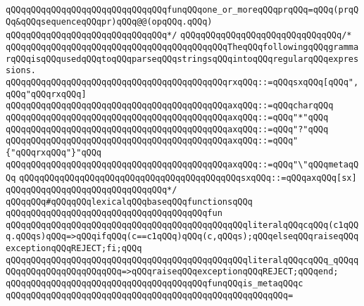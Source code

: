 \verb|qQQqqQQqqQQqqQQqqQQqqQQqqQQqqQQqfunqQQqone_or_moreqQQqprqQQq=qQQq(prqQQq&qQQqsequenceqQQqpr)qQQq@@(opqQQq.qQQq)|\newline
\verb|qQQqqQQqqQQqqQQqqQQqqQQqqQQqqQQq*/|\newline
\newline
\verb|qQQqqQQqqQQqqQQqqQQqqQQqqQQqqQQq/*|\newline
\verb|qQQqqQQqqQQqqQQqqQQqqQQqqQQqqQQqqQQqqQQqqQQqTheqQQqfollowingqQQqgrammarqQQqisqQQqusedqQQqtoqQQqparseqQQqstringsqQQqintoqQQqregularqQQqexpressions.|\newline
\newline
\verb|qQQqqQQqqQQqqQQqqQQqqQQqqQQqqQQqqQQqqQQqqQQqrxqQQq::=qQQqsxqQQq[qQQq",qQQq"qQQqrxqQQq]|\newline
\newline
\verb|qQQqqQQqqQQqqQQqqQQqqQQqqQQqqQQqqQQqqQQqqQQqaxqQQq::=qQQqcharqQQq|\newline
\verb|qQQqqQQqqQQqqQQqqQQqqQQqqQQqqQQqqQQqqQQqqQQqaxqQQq::=qQQq"*"qQQq|\newline
\verb|qQQqqQQqqQQqqQQqqQQqqQQqqQQqqQQqqQQqqQQqqQQqaxqQQq::=qQQq"?"qQQq|\newline
\verb|qQQqqQQqqQQqqQQqqQQqqQQqqQQqqQQqqQQqqQQqqQQqaxqQQq::=qQQq"{"qQQqrxqQQq"}"qQQq|\newline
\verb|qQQqqQQqqQQqqQQqqQQqqQQqqQQqqQQqqQQqqQQqqQQqaxqQQq::=qQQq"\"qQQqmetaqQQq|\newline
\newline
\verb|qQQqqQQqqQQqqQQqqQQqqQQqqQQqqQQqqQQqqQQqqQQqsxqQQq::=qQQqaxqQQq[sx]|\newline
\verb|qQQqqQQqqQQqqQQqqQQqqQQqqQQqqQQq*/|\newline
\newline
\verb|qQQqqQQq#qQQqqQQqlexicalqQQqbaseqQQqfunctionsqQQq|\newline
\verb|qQQqqQQqqQQqqQQqqQQqqQQqqQQqqQQqqQQqqQQqfun|\newline
\verb|qQQqqQQqqQQqqQQqqQQqqQQqqQQqqQQqqQQqqQQqqQQqqQQqliteralqQQqcqQQq(c1qQQq.qQQqs)qQQq=>qQQqifqQQq(c==c1qQQq)qQQq(c,qQQqs);qQQqelseqQQqraiseqQQqexceptionqQQqREJECT;fi;qQQq|\newline
\verb|qQQqqQQqqQQqqQQqqQQqqQQqqQQqqQQqqQQqqQQqqQQqqQQqliteralqQQqcqQQq_qQQqqQQqqQQqqQQqqQQqqQQqqQQq=>qQQqraiseqQQqexceptionqQQqREJECT;qQQqend;|\newline
\newline
\verb|qQQqqQQqqQQqqQQqqQQqqQQqqQQqqQQqqQQqqQQqfunqQQqis_metaqQQqc|\newline
\verb|qQQqqQQqqQQqqQQqqQQqqQQqqQQqqQQqqQQqqQQqqQQqqQQqqQQqqQQq=|\newline
